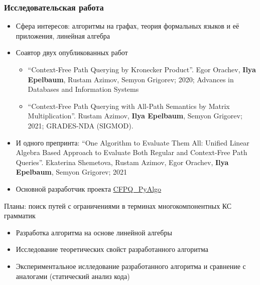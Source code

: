\documentclass[xcolor=table,aspectratio=169]{beamer}
\begin{document}
\begin{frame}[fragile] \frametitle{Исследовательская работа}
  
    \begin{itemize}
        \item Сфера интересов: алгоритмы на графах, теория формальных языков и её приложения, линейная алгебра
        \item Соавтор двух опубликованных работ
            \begin{itemize}
              \item ``Context-Free Path Querying by Kronecker Product''. Egor Orachev, \textbf{Ilya Epelbaum}, Rustam Azimov, Semyon Grigorev; 2020; Advances in Databases and Information Systems
              \item ``Context-Free Path Querying with All-Path Semantics by Matrix Multiplication''. Rustam Azimov, \textbf{Ilya Epelbaum}, Semyon Grigorev; 2021; GRADES-NDA (SIGMOD).
            \end{itemize}

        \item И одного препринта: ``One Algorithm to Evaluate Them All: Unified Linear Algebra Based Approach to Evaluate Both Regular and Context-Free Path Queries''. Ekaterina Shemetova, Rustam Azimov, Egor Orachev, \textbf{Ilya Epelbaum}, Semyon Grigorev; 2021
        \item Основной разработчик проекта \href{https://github.com/JetBrains-Research/CFPQ_PyAlgo}{CFPQ\_PyAlgo}
    \end{itemize}
  \pause
  \vfill
  Планы: поиск путей с ограничениями в терминах многокомпонентных КС грамматик
  \begin{itemize}
        \item Разработка алгоритма на основе линейной алгебры
        \item Исследование теоретических свойст разработанного алгоритма
        \item Экспериментальное ислледование разработанного алгоритма и сравнение с аналогами (статический анализ кода)
  \end{itemize}

\end{frame}
\end{document}
